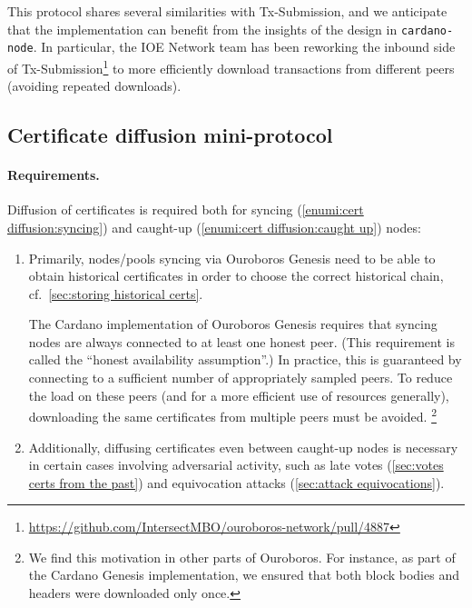 This protocol shares several similarities with Tx-Submission, and we anticipate that the implementation can benefit from the insights of the design in \texttt{cardano-node}.
In particular, the IOE Network team has been reworking the inbound side of Tx-Submission\footnote{\url{https://github.com/IntersectMBO/ouroboros-network/pull/4887}} to more efficiently download transactions from different peers (avoiding repeated downloads).

\subsection{Certificate diffusion mini-protocol}%
\label{sec:certificate-diffusion}

\paragraph{Requirements.}

Diffusion of certificates is required both for syncing (\ref{enumi:cert diffusion:syncing}) and caught-up (\ref{enumi:cert diffusion:caught up}) nodes:

\begin{enumerate}
\item\label{enumi:cert diffusion:syncing}
  Primarily, nodes/pools syncing via Ouroboros Genesis need to be able to obtain historical certificates in order to choose the correct historical chain, cf.~\cref{sec:storing historical certs}.

  The Cardano implementation of Ouroboros Genesis \parencite{genesis-implementation-documentation} requires that syncing nodes are always connected to at least one honest peer.
(This requirement is called the \enquote{honest availability assumption}.)
In practice, this is guaranteed by connecting to a sufficient number of appropriately sampled peers.
To reduce the load on these peers (and for a more efficient use of resources generally), downloading the same certificates from multiple peers must be avoided.%
%
\footnote{We find this motivation in other parts of Ouroboros. For instance, as part of the Cardano Genesis implementation, we ensured that both block bodies and headers were downloaded only once.\cite{genesis-implementation-documentation}}
\item\label{enumi:cert diffusion:caught up}
  Additionally, diffusing certificates even between caught-up nodes is necessary in certain cases involving adversarial activity, such as late votes (\cref{sec:votes certs from the past}) and equivocation attacks (\cref{sec:attack equivocations}).
\end{enumerate}

